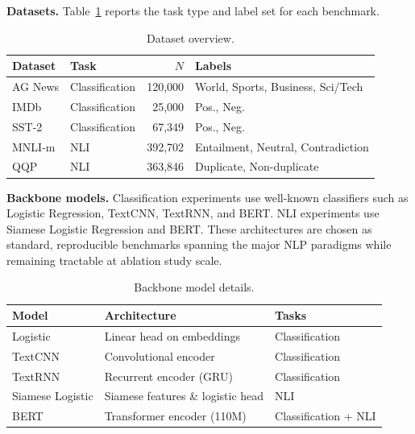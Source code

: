 \documentclass[runningheads]{llncs}
\begin{document}
\textbf{Datasets.}
Table~\ref{tab:datasets} reports the task type and label set for each benchmark.

\begin{table}[h]
    \caption{Dataset overview.}
    \label{tab:datasets}
    \centering
    \begin{tabular}{llrl}
        \toprule
        \textbf{Dataset} & \textbf{Task} & $N$ & \textbf{Labels} \\
        \midrule
        AG News   & Classification & 120,000 & World, Sports, Business, Sci/Tech \\
        IMDb      & Classification &  25,000 & Pos., Neg. \\
        SST-2     & Classification &  67,349 & Pos., Neg. \\
        MNLI-m    & NLI            & 392,702 & Entailment, Neutral, Contradiction \\
        QQP       & NLI            & 363,846 & Duplicate, Non-duplicate \\
        \bottomrule
    \end{tabular}
\end{table}

\textbf{Backbone models.}
Classification experiments use well-known classifiers such as Logistic Regression, TextCNN, TextRNN, and BERT.
NLI experiments use Siamese Logistic Regression and BERT.
These architectures are chosen as standard, reproducible benchmarks spanning the major NLP paradigms while remaining tractable at ablation study scale.

\begin{table}[h]
    \caption{Backbone model details.}
    \label{tab:backbones}
    \centering
    \begin{tabular}{lll}
        \toprule
        \textbf{Model}        & \textbf{Architecture}        & \textbf{Tasks} \\
        \midrule
        Logistic              & Linear head on embeddings    & Classification \\
        TextCNN               & Convolutional encoder        & Classification \\
        TextRNN               & Recurrent encoder (GRU)      & Classification \\
        Siamese Logistic      & Siamese features \& logistic head & NLI \\
        BERT & Transformer encoder (110M) & Classification + NLI \\
        \bottomrule
    \end{tabular}
\end{table}
\end{document}
